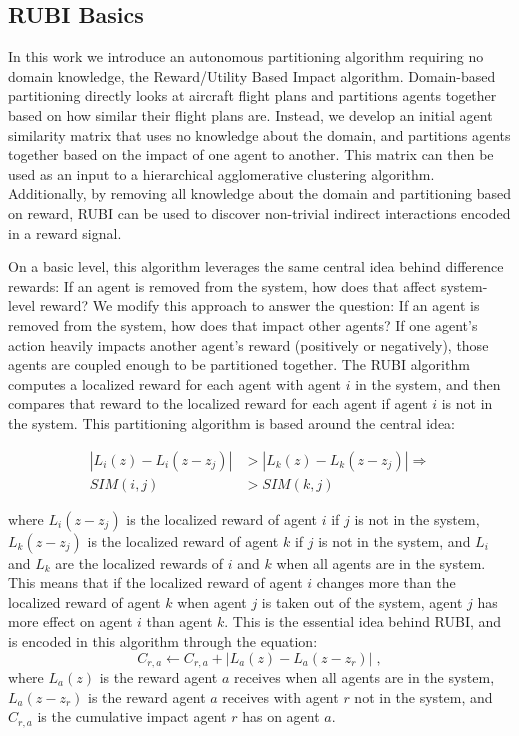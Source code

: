\documentclass{aamas2014}
\begin{document}
\subsection{RUBI Basics}
In this work we introduce an autonomous partitioning algorithm requiring no domain knowledge, the Reward/Utility Based Impact algorithm. Domain-based partitioning directly looks at aircraft flight plans and partitions agents together based on how similar their flight plans are. Instead, we develop an initial agent similarity matrix that uses no knowledge about the domain, and partitions agents together based on the impact of one agent to another. This matrix can then be used as an input to a hierarchical agglomerative clustering algorithm. Additionally, by removing all knowledge about the domain and partitioning based on reward, RUBI can be used to discover non-trivial indirect interactions encoded in a reward signal.

On a basic level, this algorithm leverages the same central idea behind difference rewards: If an agent is removed from the system, how does that affect system-level reward? We modify this approach to answer the question: If an agent is removed from the system, how does that impact other agents? If one agent's action heavily impacts another agent's reward (positively or negatively), those agents are coupled enough to be partitioned together. The RUBI algorithm computes a localized reward for each agent with agent $i$ in the system, and then compares that reward to the localized reward for each agent if agent $i$ is not in the system. This partitioning algorithm is based around the central idea:

\begin{align}
|L_i(z) - L_i(z-z_j)| &> |L_k(z) - L_k(z-z_j)|   \Rightarrow \\
SIM(i,j) &> SIM(k,j) \nonumber
\end{align}

where $L_i(z-z_j)$ is the localized reward of agent $i$ if $j$ is not in the system, $L_k(z-z_j)$ is the localized reward of agent $k$ if $j$ is not in the system, and $L_i$ and $L_k$ are the localized rewards of $i$ and $k$ when all agents are in the system. This means that if the localized reward of agent $i$ changes more than the localized reward of agent $k$ when agent $j$ is taken out of the system, agent $j$ has more effect on agent $i$ than agent $k$. This is the essential idea behind RUBI, and is encoded in this algorithm through the equation:
%
\begin{equation} \label{eq:RUBI Update}
C_{r,a} \leftarrow C_{r,a} + |L_a(z) - L_a(z-z_r) | \;,
\end{equation}
%
where $L_a(z)$ is the reward agent $a$ receives when all agents are in the system, $L_a(z-z_r)$ is the reward agent $a$ receives with agent $r$ not in the system, and $C_{r,a}$ is the cumulative impact agent $r$ has on agent $a$.
\end{document}
